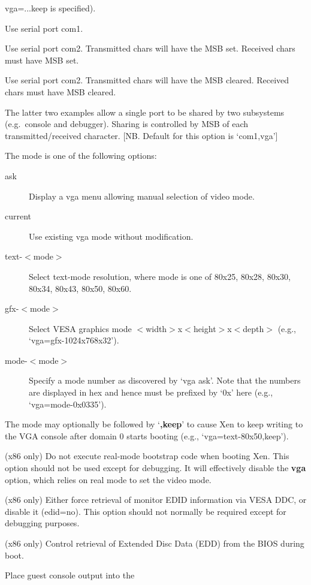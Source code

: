 \documentclass[11pt,twoside,final,openright]{report}
\begin{document}
\begin{description}
\begin{description}
{  vga=...keep } is specified).
  \item[ com1 ] Use serial port com1.
  \item[ com2H ] Use serial port com2. Transmitted chars will have the
    MSB set. Received chars must have MSB set.
  \item[ com2L] Use serial port com2. Transmitted chars will have the
    MSB cleared. Received chars must have MSB cleared.
  \end{description}
  The latter two examples allow a single port to be shared by two
  subsystems (e.g.\ console and debugger). Sharing is controlled by
  MSB of each transmitted/received character.  [NB. Default for this
  option is `com1,vga']
\item [ vga=$<$mode$>$(,keep) ] The mode is one of the following options:
  \begin{description}
  \item[ ask ] Display a vga menu allowing manual selection of video
  mode.
  \item[ current ] Use existing vga mode without modification.
  \item[ text-$<$mode$>$ ] Select text-mode resolution, where mode is
  one of 80x25, 80x28, 80x30, 80x34, 80x43, 80x50, 80x60.
  \item[ gfx-$<$mode$>$ ] Select VESA graphics mode
  $<$width$>$x$<$height$>$x$<$depth$>$ (e.g., `vga=gfx-1024x768x32').
  \item[ mode-$<$mode$>$ ] Specify a mode number as discovered by `vga
  ask'. Note that the numbers are displayed in hex and hence must be
  prefixed by `0x' here (e.g., `vga=mode-0x0335').
  \end{description}
The mode may optionally be followed by `{\bf,keep}' to cause Xen to keep
writing to the VGA console after domain 0 starts booting (e.g., `vga=text-80x50,keep').
\item [ no-real-mode ] (x86 only) Do not execute real-mode bootstrap
  code when booting Xen. This option should not be used except for
  debugging. It will effectively disable the {\bf vga} option, which
  relies on real mode to set the video mode.
\item [ edid=no,force ] (x86 only) Either force retrieval of monitor
  EDID information via VESA DDC, or disable it (edid=no). This option
  should not normally be required except for debugging purposes.
\item [ edd=off,on,skipmbr ] (x86 only) Control retrieval of Extended
  Disc Data (EDD) from the BIOS during boot.
\item [ console\_to\_ring ] Place guest console output into the

\end{description}
\end{document}

